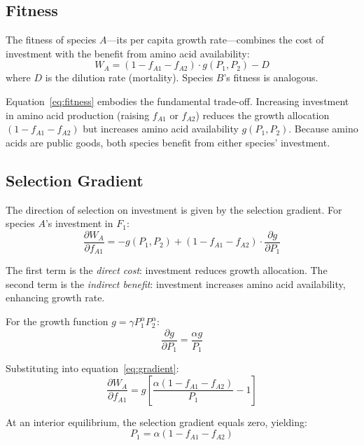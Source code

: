 \documentclass[11pt]{article}
\newcommand{\pd}[2]{\frac{\partial #1}{\partial #2}}
\begin{document}
\subsection{Fitness}

The fitness of species $A$---its per capita growth rate---combines the cost of investment with the benefit from amino acid availability:
\begin{equation}
W_A = (1 - f_{A1} - f_{A2}) \cdot g(P_1, P_2) - D
\label{eq:fitness}
\end{equation}
where $D$ is the dilution rate (mortality). Species $B$'s fitness is analogous.

Equation~\ref{eq:fitness} embodies the fundamental trade-off. Increasing investment in amino acid production (raising $f_{A1}$ or $f_{A2}$) reduces the growth allocation $(1 - f_{A1} - f_{A2})$ but increases amino acid availability $g(P_1, P_2)$. Because amino acids are public goods, both species benefit from either species' investment.

\subsection{Selection Gradient}

The direction of selection on investment is given by the selection gradient. For species $A$'s investment in $F_1$:
\begin{equation}
\pd{W_A}{f_{A1}} = -g(P_1, P_2) + (1 - f_{A1} - f_{A2}) \cdot \pd{g}{P_1}
\label{eq:gradient}
\end{equation}

The first term is the \textit{direct cost}: investment reduces growth allocation. The second term is the \textit{indirect benefit}: investment increases amino acid availability, enhancing growth rate.

For the growth function $g = \gamma P_1^\alpha P_2^\alpha$:
\begin{equation}
\pd{g}{P_1} = \frac{\alpha g}{P_1}
\end{equation}

Substituting into equation~\ref{eq:gradient}:
\begin{equation}
\pd{W_A}{f_{A1}} = g \left[ \frac{\alpha(1 - f_{A1} - f_{A2})}{P_1} - 1 \right]
\label{eq:gradient_explicit}
\end{equation}

At an interior equilibrium, the selection gradient equals zero, yielding:
\begin{equation}
P_1 = \alpha(1 - f_{A1} - f_{A2})
\label{eq:equilibrium_condition}
\end{equation}
\end{document}
